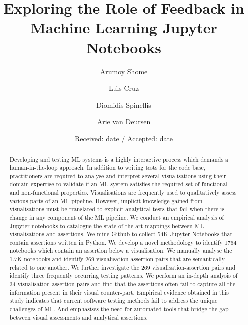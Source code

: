 \title{Exploring the Role of Feedback in Machine Learning Jupyter Notebooks}


\author{Arumoy Shome\and
  Lu{\`\i}s Cruz\and
  Diomidis Spinellis\and
  Arie van Deursen
}



\date{Received: date / Accepted: date}


\maketitle

\begin{abstract}

  Developing and testing ML systems is a highly interactive process which demands a human-in-the-loop approach. In addition to writing tests for the code base, practitioners are required to analyse and interpret several visualisations using their domain expertise to validate if an ML system satisfies the required set of functional and non-functional properties. Visualisations are frequently used to qualitatively assess various parts of an ML pipeline. However, implicit knowledge gained from visualisations must be translated to explicit analytical tests that fail when there is change in any component of the ML pipeline. We conduct an empirical analysis of Jupyter notebooks to catalogue the state-of-the-art mappings between ML visualisations and assertions. We mine Github to collect 54K Jupyter Notebooks that contain assertions written in Python. We develop a novel methodology to identify 1764 notebooks which contain an assertion below a visualisation. We manually analyse the 1.7K notebooks and identify 269 visualisation-assertion pairs that are semantically related to one another. We further investigate the 269 visualisation-assertion pairs and identify three frequently occurring testing patterns. We perform an in-depth analysis of 34 visualisation-assertion pairs and find that the assertions often fail to capture all the information present in their visual counter-part. Empirical evidence obtained in this study indicates that current software testing methods fail to address the unique challenges of ML. And emphasises the need for automated tools that bridge the gap between visual assessments and analytical assertions.

\end{abstract}

